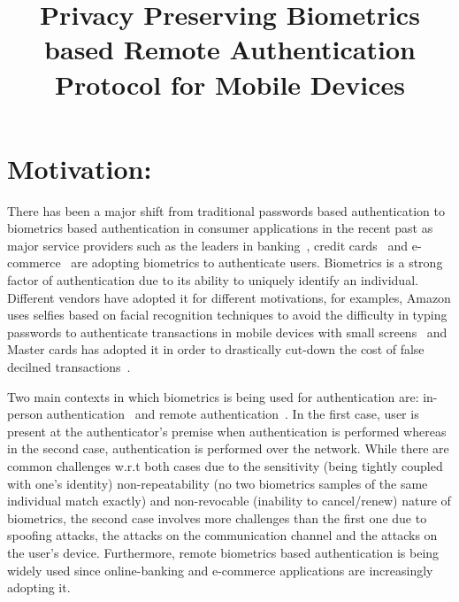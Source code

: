 \documentclass[10pt]{article}
\title{
\vspace{-20.mm}
Privacy Preserving Biometrics based Remote Authentication Protocol for Mobile Devices}
\date{}
\begin{document}
\maketitle
\section{Motivation:}
There has been a major shift from traditional passwords based authentication to biometrics based authentication in consumer applications in the 
recent past as major service providers such as the leaders in banking~\cite{citi, hsbc, usaa}, credit cards~\cite{mastercard} and 
e-commerce~\cite{amazon, alibaba} are adopting biometrics to authenticate users.
Biometrics is a strong factor of authentication due to its ability to uniquely identify an individual. Different 
vendors have adopted it for different motivations, for examples, Amazon uses selfies based on facial recognition techniques to avoid the difficulty 
in typing passwords to authenticate transactions in mobile devices with small screens~\cite{amazon} and  Master cards has adopted it in order to 
drastically cut-down the cost of false decilned transactions~\cite{mastercard}.

Two main contexts in which biometrics is being used for authentication are: in-person authentication~\cite{google} and remote 
authentication~\cite{hsbc}. In the first case, user is present at the authenticator's premise when authentication is performed 
whereas in the second case, authentication is performed over the network. 
While there are common challenges w.r.t both cases due to the sensitivity (being tightly coupled with one's identity) non-repeatability (no 
two biometrics samples of the same individual match exactly) and non-revocable (inability to cancel/renew) nature of biometrics, the second case 
involves more challenges than the first one due to spoofing attacks, the attacks on the communication channel and the attacks on the user's 
device. Furthermore, remote biometrics based authentication is being widely 
used since online-banking and e-commerce applications are increasingly adopting it.
\end{document}
